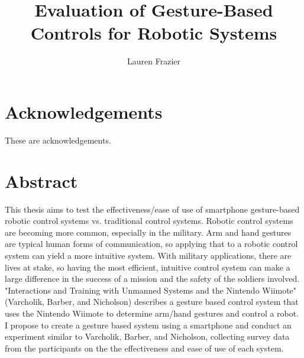 \documentclass[12pt,a4paper]{report}
\author{Lauren Frazier}
\title{Evaluation of Gesture-Based Controls for Robotic Systems}
\begin{document}
\maketitle
\newcommand{\todo}[1]{
    \addcontentsline{tdo}{todo}{\protect{#1}}
    \marginpar{#1}
}

\makeatletter \newcommand {}
  \newcommand\l@todo[2]
    {\par\noindent \textit{#2}, \parbox{10cm}{#1}\par} \makeatother
    
    
\listoftodos

\setcounter{page}{1}
\tableofcontents
\listoftables
\listoffigures

\chapter*{Acknowledgements}
These are acknowledgements.

\chapter*{Abstract}
This thesis aims to test the effectiveness/ease of use of smartphone gesture-based robotic control systems vs. traditional control systems.  Robotic control systems are becoming more common, especially in the military. Arm and hand gestures are typical human forms of communication, so applying that to a robotic control system can yield a more intuitive system. With military applications, there are lives at stake, so having the most efficient, intuitive control system can make a large difference in the success of a mission and the safety of the soldiers involved. 
"Interactions and Training with Unmanned Systems and the Nintendo Wiimote" (Varcholik, Barber, and Nicholson) describes a gesture based control system that uses the Nintendo Wiimote to determine arm/hand gestures and control a robot. I propose to create a gesture based system using a smartphone and conduct an experiment similar to Varcholik, Barber, and Nicholson, collecting survey data from the participants on the the effectiveness and ease of use of each system.
\end{document}
